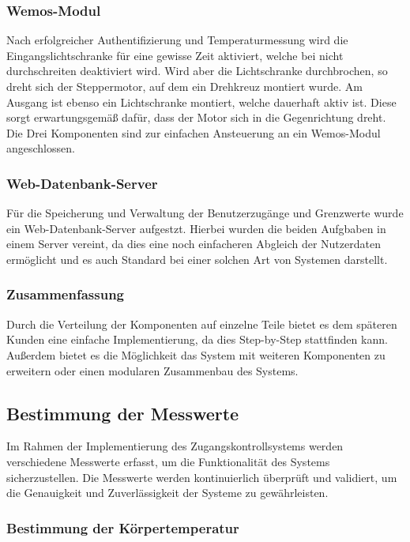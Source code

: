 \subsubsection{Wemos-Modul}

Nach erfolgreicher Authentifizierung und Temperaturmessung wird die Eingangslichtschranke für eine gewisse Zeit aktiviert, welche bei nicht durchschreiten deaktiviert wird. Wird aber die Lichtschranke durchbrochen, so dreht sich der Steppermotor, auf dem ein Drehkreuz montiert wurde. Am Ausgang ist ebenso ein Lichtschranke montiert, welche dauerhaft aktiv ist. Diese sorgt erwartungsgemäß dafür, dass der Motor sich in die Gegenrichtung dreht. Die Drei Komponenten sind zur einfachen Ansteuerung an ein Wemos-Modul angeschlossen.

\subsubsection{Web-Datenbank-Server}

Für die Speicherung und Verwaltung der Benutzerzugänge und Grenzwerte wurde ein Web-Datenbank-Server aufgestzt. Hierbei wurden die beiden Aufgbaben in einem Server vereint, da dies eine noch einfacheren Abgleich der Nutzerdaten ermöglicht und es auch Standard bei einer solchen Art von Systemen darstellt.

\subsubsection{Zusammenfassung}

Durch die Verteilung der Komponenten auf einzelne Teile bietet es dem späteren Kunden eine einfache Implementierung, da dies Step-by-Step stattfinden kann. Außerdem bietet es die Möglichkeit das System mit weiteren Komponenten zu erweitern oder einen modularen Zusammenbau des Systems.


\subsection{Bestimmung der Messwerte}

Im Rahmen der Implementierung des Zugangskontrollsystems werden verschiedene Messwerte erfasst, um die Funktionalität des Systems sicherzustellen. Die Messwerte werden kontinuierlich überprüft und validiert, um die Genauigkeit und Zuverlässigkeit der Systeme zu gewährleisten.

\subsubsection{Bestimmung der Körpertemperatur}

